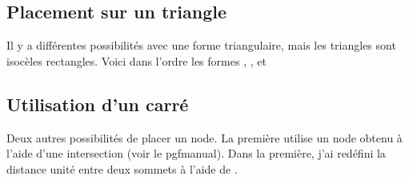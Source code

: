 \subsection{Placement sur un triangle }

Il y a différentes possibilités avec une forme triangulaire, mais les triangles sont isocèles rectangles. Voici dans l'ordre les formes ,  ,  et 


\begin{tkzexample}[latex=8cm,small]  
\hspace*{2cm}
\end{tkzexample}

\begin{tkzexample}[latex=8cm,small]  
\hspace*{2cm}
\end{tkzexample}  


\subsection{Utilisation d'un carré}

 
Deux autres possibilités de placer un node. La première utilise un node obtenu à l'aide d'une intersection (voir le pgfmanual). Dans la première, j'ai redéfini la distance unité entre deux sommets à l'aide de   .

\begin{center}
\begin{tkzexample}[latex=7cm,small]
\end{tkzexample}
\end{center}


